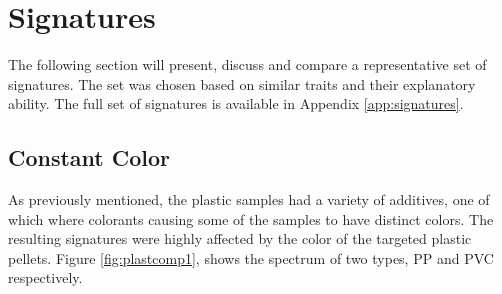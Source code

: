 \vspace{1.3cm}
\section{Signatures}
The following section will present, discuss and compare a representative set of signatures. The set was chosen based on similar traits and their explanatory ability. The full set of signatures is available in Appendix \ref{app:signatures}.

\subsection{Constant Color}
As previously mentioned, the plastic samples had a variety of additives, one of which where colorants causing some of the samples to have distinct colors. The resulting signatures were highly affected by the color of the targeted plastic pellets. Figure \ref{fig:plastcomp1}, shows the spectrum of two types, PP and PVC respectively. 

